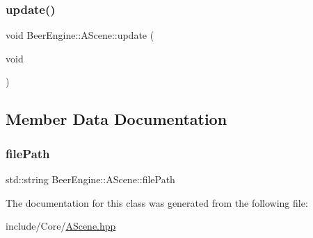 \mbox{\label{class_beer_engine_1_1_a_scene_aee4c99b65b3e54bdcb62cc1096dcb397}} 
\subsubsection{\texorpdfstring{update()}{update()}}
{\footnotesize\ttfamily void Beer\+Engine\+::\+A\+Scene\+::update (\begin{DoxyParamCaption}\item[{void}]{ }\end{DoxyParamCaption})}



\subsection{Member Data Documentation}
\mbox{\label{class_beer_engine_1_1_a_scene_a2edf1030b7232a5f703d327976f1d4ea}} 
\subsubsection{\texorpdfstring{file\+Path}{filePath}}
{\footnotesize\ttfamily std\+::string Beer\+Engine\+::\+A\+Scene\+::file\+Path}



The documentation for this class was generated from the following file\+:\begin{DoxyCompactItemize}
\item 
include/\+Core/\mbox{\hyperlink{_a_scene_8hpp}{A\+Scene.\+hpp}}\end{DoxyCompactItemize}
